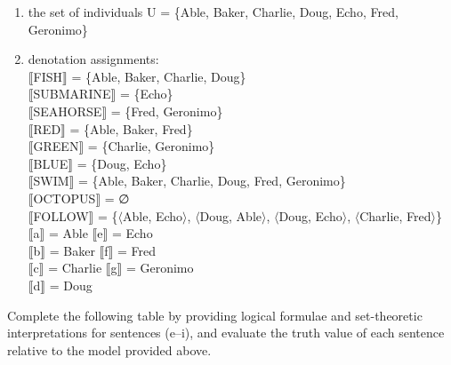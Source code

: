     \z
\begin{enumerate}
\item the set of individuals U = \{Able, Baker, Charlie, Doug, Echo, Fred, Geronimo\}
\item denotation assignments\textsc{:\\
{}$\llbracket$}\textsc{FISH}$\rrbracket$  = \{Able, Baker, Charlie, Doug\}\\
\textsc{$\llbracket$}SUBMARINE$\rrbracket$  = \{Echo\}\\
\textsc{$\llbracket$}SEAHORSE$\rrbracket$  = \{Fred, Geronimo\}\\
\textsc{$\llbracket$}RED$\rrbracket$  = \{Able, Baker, Fred\}\\
\textsc{$\llbracket$}GREEN$\rrbracket$  = \{Charlie, Geronimo\}\\
\textsc{$\llbracket$}BLUE$\rrbracket$  = \{Doug, Echo\}\\
\textsc{$\llbracket$}SWIM$\rrbracket$  = \{Able, Baker, Charlie, Doug, Fred, Geronimo\}\\
\textsc{$\llbracket$}OCTOPUS$\rrbracket$  = ∅\\
{}$\llbracket$FOLLOW$\rrbracket$  = \{$\langle$Able, Echo$\rangle$, $\langle$Doug, Able$\rangle$, $\langle$Doug, Echo$\rangle$, $\langle$Charlie, Fred$\rangle$\}\\
\textsc{$\llbracket$}a$\rrbracket$  = Able  \textsc{$\llbracket$}e$\rrbracket$  = Echo\\
\textsc{$\llbracket$}b$\rrbracket$  = Baker  \textsc{$\llbracket$}f$\rrbracket$  = Fred\\
\textsc{$\llbracket$}c$\rrbracket$  = Charlie  \textsc{$\llbracket$}g$\rrbracket$  = Geronimo\\
\textsc{$\llbracket$}d$\rrbracket$  = Doug
\end{enumerate}
\begin{stylepoints}
\ea \label{ex:13.}%
    \label{ex:key:2}




          Complete the following table by providing logical formulae and set-theoretic interpretations for sentences (e–i), and evaluate the truth value of each sentence relative to the model provided above.
    \z
\end{stylepoints}


